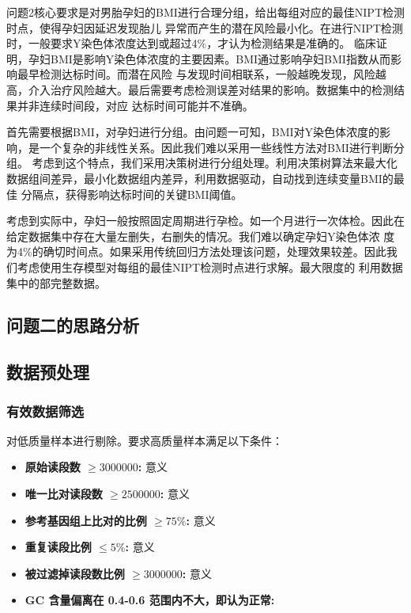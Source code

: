 \documentclass[withoutpreface,notoc]{cumcmthesis}
\begin{document}
	问题2核心要求是对男胎孕妇的BMI进行合理分组，给出每组对应的最佳NIPT检测时点，使得孕妇因延迟发现胎儿
	异常而产生的潜在风险最小化。在进行NIPT检测时，一般要求Y染色体浓度达到或超过4\%，才认为检测结果是准确的。
	临床证明，孕妇BMI是影响Y染色体浓度的主要因素。BMI通过影响孕妇BMI指数从而影响最早检测达标时间。而潜在风险
	与发现时间相联系，一般越晚发现，风险越高，介入治疗风险越大。最后需要考虑检测误差对结果的影响。数据集中的检测结果并非连续时间段，对应
	达标时间可能并不准确。

	首先需要根据BMI，对孕妇进行分组。由问题一可知，BMI对Y染色体浓度的影响，是一个复杂的非线性关系。因此我们难以采用一些线性方法对BMI进行判断分组。
	考虑到这个特点，我们采用决策树进行分组处理。利用决策树算法来最大化数据组间差异，最小化数据组内差异，利用数据驱动，自动找到连续变量BMI的最佳
	分隔点，获得影响达标时间的关键BMI阈值。

	考虑到实际中，孕妇一般按照固定周期进行孕检。如一个月进行一次体检。因此在给定数据集中存在大量左删失，右删失的情况。我们难以确定孕妇Y染色体浓
	度为4\%的确切时间点。如果采用传统回归方法处理该问题，处理效果较差。因此我们考虑使用生存模型对每组的最佳NIPT检测时点进行求解。最大限度的
	利用数据集中的部完整数据。


	\subsection{问题二的思路分析}

	\subsection{数据预处理}

	\subsubsection{有效数据筛选}

	对低质量样本进行剔除。要求高质量样本满足以下条件：
	\begin{itemize}[itemindent=2em]
		\item \textbf{原始读段数 $\geq 3000000$:} 意义
		\item \textbf{唯一比对读段数 $\geq 2500000$:} 意义
		\item \textbf{参考基因组上比对的比例 $\geq 75\%$:} 意义
		\item \textbf{重复读段比例 $\leq 5\%$:} 意义
		\item \textbf{被过滤掉读段数比例 $\geq 3000000$:} 意义
		\item \textbf{GC 含量偏离在 0.4-0.6 范围内不大，即认为正常:} 
	\end{itemize}
\end{document}
